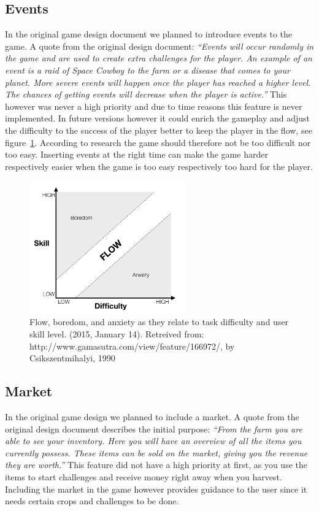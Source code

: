 \subsection{Events}
In the original game design document we planned to introduce events to the game. A quote from the original design document:
\textit{``Events will occur randomly in the game and are used to create extra challenges for the player. An example of an event is a raid of Space Cowboy to the farm or a disease that comes to your planet. More severe events will happen once the player has reached a higher level. The chances of getting events will decrease when the player is active.''}
This however was never a high priority and due to time reasons this feature is never implemented. In future versions however it could enrich the gameplay and adjust the difficulty to the success of the player better to keep the player in the flow, see figure~\ref{fig:gamedifficulty}. According to research the game should therefore not be too difficult nor too easy. Inserting events at the right time can make the game harder respectively easier when the game is too easy respectively too hard for the player. 

\begin{figure}[h]
	\centering
		\includegraphics[width=0.60\textwidth]{images/DynamicGameDifficulty.png}
	\caption{Flow, boredom, and anxiety as they relate to task difficulty and user skill level. (2015, January 14). Retreived from: http://www.gamasutra.com/view/feature/166972/, by Csikszentmihalyi, 1990}
	\label{fig:gamedifficulty}
\end{figure}

\subsection{Market}
In the original game design we planned to include a market. A quote from the original design document describes the initial purpose:
\textit{``From the farm you are able to see your inventory. Here you will have an overview of all the items you currently possess. These items can be sold on the market, giving you the revenue they are worth.''}
This feature did not have a high priority at first, as you use the items to start challenges and receive money right away when you harvest. Including the market in the game however provides guidance to the user since it needs certain crops and challenges to be done. 

